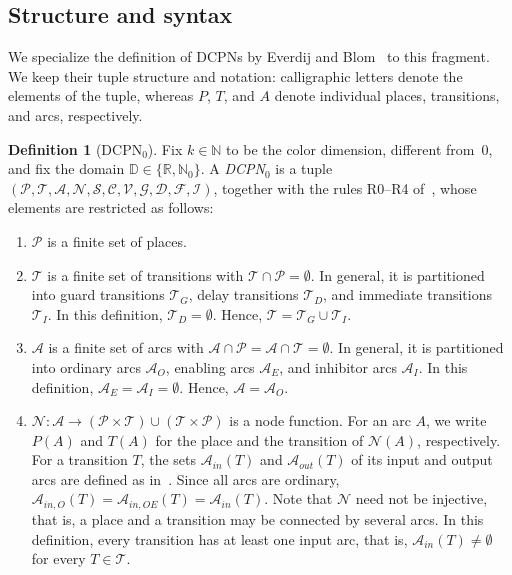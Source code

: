 \documentclass[11pt]{article}
\theoremstyle{definition}
\newcommand{\Nat}{\mathbb{N}}
\newcommand{\NatZero}{\mathbb{N}_0}
\newcommand{\Real}{\mathbb{R}}
\newcommand{\Dom}{\mathbb{D}}
\newcommand{\DCPN}[1]{\texorpdfstring{\textup{DCPN}\ensuremath{_{#1}}}{DCPN#1}}
\newtheorem{definition}{Definition}
\begin{document}
\subsection{Structure and syntax}

We specialize the definition of DCPNs by Everdij and
Blom~\cite[Sec.~3.1]{EverdijBlom2005} to this fragment. We keep their tuple
structure and notation: calligraphic letters denote the elements of the tuple,
whereas $P$, $T$, and $A$ denote individual places, transitions, and arcs,
respectively.

\begin{definition}[\DCPN{0}]\label{def:dcpn0}
  Fix $k \in \Nat$ to be the color dimension, different from~0, and fix the
  domain $\Dom \in \{\Real, \NatZero\}$.
  A \emph{\DCPN{0}} is a tuple
  $(\mathcal{P}, \mathcal{T}, \mathcal{A}, \mathcal{N}, \mathcal{S},
    \mathcal{C}, \mathcal{V}, \mathcal{G}, \mathcal{D}, \mathcal{F},
    \mathcal{I})$,
  together with the rules R0--R4 of~\cite{EverdijBlom2005}, whose elements
  are restricted as follows:

  \begin{enumerate}
    \item $\mathcal{P}$ is a finite set of places.

    \item $\mathcal{T}$ is a finite set of transitions with $\mathcal{T} \cap
      \mathcal{P} = \emptyset$. In general, it is partitioned into guard
      transitions $\mathcal{T}_G$, delay transitions $\mathcal{T}_D$, and
      immediate transitions $\mathcal{T}_I$. In this definition, $\mathcal{T}_D
      = \emptyset$. Hence, $\mathcal{T} = \mathcal{T}_G \cup \mathcal{T}_I$.

    \item $\mathcal{A}$ is a finite set of arcs with $\mathcal{A} \cap
      \mathcal{P} = \mathcal{A} \cap \mathcal{T} = \emptyset$.  In general, it
      is partitioned into ordinary arcs $\mathcal{A}_O$, enabling arcs
      $\mathcal{A}_E$, and inhibitor arcs $\mathcal{A}_I$. In this definition,
      $\mathcal{A}_E = \mathcal{A}_I = \emptyset$. Hence, $\mathcal{A} =
      \mathcal{A}_O$.

    \item $\mathcal{N} : \mathcal{A} \to
      (\mathcal{P} \times \mathcal{T}) \cup (\mathcal{T} \times \mathcal{P})$
      is a node function. For an arc $A$, we write $P(A)$ and $T(A)$ for the
      place and the transition of $\mathcal{N}(A)$, respectively. For a
      transition $T$, the sets $\mathcal{A}_{\mathit{in}}(T)$ and
      $\mathcal{A}_{\mathit{out}}(T)$ of its input and output arcs are defined
      as in~\cite{EverdijBlom2005}. Since all arcs are ordinary,
      $\mathcal{A}_{\mathit{in},O}(T) = \mathcal{A}_{\mathit{in},OE}(T)
        = \mathcal{A}_{\mathit{in}}(T)$. Note that
      $\mathcal{N}$ need not be injective, that is, a place and a transition
      may be connected by several arcs. In this definition, every transition
      has at least one input arc, that is,
      $\mathcal{A}_{\mathit{in}}(T) \ne \emptyset$ for every
      $T \in \mathcal{T}$.


\end{enumerate}
\end{definition}
\end{document}
